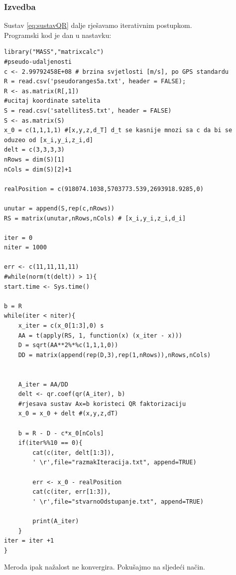 \documentclass[a4paper,twoside,12pt]{memoir} %
\begin{document}
\subsubsection{Izvedba}
Sustav \ref{eq:sustavQR} dalje rješavamo iterativnim postupkom.\\
Programski kod je dan u nastavku:%
\begin{lstlisting}
library("MASS","matrixcalc")
#pseudo-udaljenosti
c <- 2.99792458E+08 # brzina svjetlosti [m/s], po GPS standardu
R = read.csv('pseudoranges5a.txt', header = FALSE);
R <- as.matrix(R[,1])
#ucitaj koordinate satelita
S = read.csv('satellites5.txt', header = FALSE)
S <- as.matrix(S)
x_0 = c(1,1,1,1) #[x,y,z,d_T] d_t se kasnije mnozi sa c da bi se oduzeo od [x_i,y_i,z_i,d] 
delt = c(3,3,3,3)
nRows = dim(S)[1]
nCols = dim(S)[2]+1

realPosition = c(918074.1038,5703773.539,2693918.9285,0)

unutar = append(S,rep(c,nRows))
RS = matrix(unutar,nRows,nCols) # [x_i,y_i,z_i,d_i] 

iter = 0
niter = 1000

err <- c(11,11,11,11)
#while(norm(t(delt)) > 1){
start.time <- Sys.time()

b = R
while(iter < niter){
	x_iter = c(x_0[1:3],0) s
	AA = t(apply(RS, 1, function(x) (x_iter - x)))
	D = sqrt(AA**2%*%c(1,1,1,0))
	DD = matrix(append(rep(D,3),rep(1,nRows)),nRows,nCols)
	
	
	A_iter = AA/DD
	delt <- qr.coef(qr(A_iter), b) 
	#rjesava sustav Ax=b koristeci QR faktorizaciju
	x_0 = x_0 + delt #(x,y,z,dT)
	
	b = R - D - c*x_0[nCols]
	if(iter%%10 == 0){
		cat(c(iter, delt[1:3]),
		' \r',file="razmakIteracija.txt", append=TRUE)
		
		err <- x_0 - realPosition
		cat(c(iter, err[1:3]),
		' \r',file="stvarnoOdstupanje.txt", append=TRUE) 
		
		print(A_iter) 
	}
iter = iter +1
}
\end{lstlisting}%
Meroda ipak nažalost ne konvergira. Pokušajmo na sljedeći način.
\end{document}
